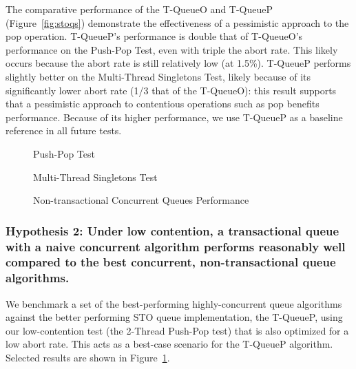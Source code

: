 The comparative performance of the T-QueueO and T-QueueP (Figure~\ref{fig:stoqs}) demonstrate the effectiveness of a pessimistic approach to the pop operation. T-QueueP's performance is double that of T-QueueO's performance on the Push-Pop Test, even with triple the abort rate. This likely occurs because the abort rate is still relatively low (at 1.5\%). T-QueueP performs slightly better on the Multi-Thread Singletons Test, likely because of its significantly lower abort rate (1/3 that of the T-QueueO): this result supports that a pessimistic approach to contentious operations such as pop benefits performance. Because of its higher performance, we use T-QueueP as a baseline reference in all future tests.

\vspace{12pt}
\noindent{}

\begin{figure}[H]
    \centering
	\begin{minipage}{0.75\textwidth}
        \caption*{Push-Pop Test}
        \vspace{12pt}
	\end{minipage}
   	\begin{minipage}{0.75\textwidth}
        \caption*{Multi-Thread Singletons Test}
	\end{minipage}
        \caption{Non-transactional Concurrent Queues Performance}
    \label{fig:ntqs}
\end{figure}

\subsubsection{Hypothesis 2: Under low contention, a transactional queue with a naive concurrent algorithm performs reasonably well compared to the best concurrent, non-transactional queue algorithms.}

We benchmark a set of the best-performing highly-concurrent queue algorithms against the better performing STO queue implementation, the T-QueueP, using our low-contention test (the 2-Thread Push-Pop test) that is also optimized for a low abort rate. This acts as a best-case scenario for the T-QueueP algorithm. Selected results are shown in Figure~\ref{fig:ntqs}.

